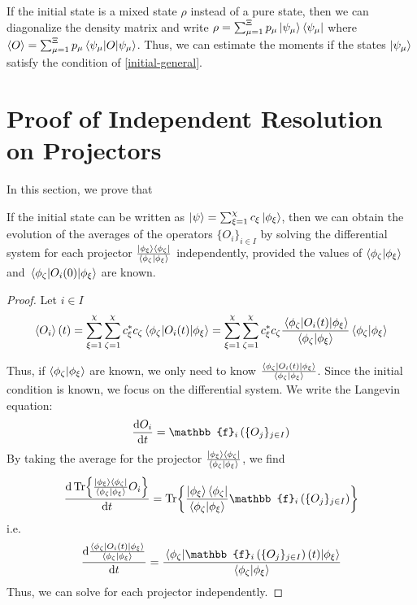 \begin{corollary}
    If the initial state is a mixed state $\rho$ instead of a pure state, then we can diagonalize the density matrix and write $\rho = \sum_{\mu=1}^\Xi p_\mu \ket{\psi_\mu}\bra{\psi_\mu}$ where $\left\langle O \right\rangle = \sum_{\mu=1}^\Xi p_\mu \mel{\psi_\mu}{O}{\psi_\mu}$. Thus, we can estimate the moments if the states $\ket{\psi_\mu}$ satisfy the condition of \autoref{initial-general}.
\end{corollary}

\section{Proof of Independent Resolution on Projectors} \label{proof-sum-gauss-non-lin}
In this section, we prove that 

\begin{theorem}
    If the initial state can be written as $\ket{\psi} = \sum_{\xi=1}^\chi c_\xi \ket{\phi_\xi}$, then we can obtain the evolution of the averages of the operators $\{O_i\}_{i \in I}$ by solving the differential system for each projector $\frac{\ket{\phi_\xi}\bra{\phi_\zeta}}{\braket{\phi_\zeta}{\phi_\xi}}$ independently, provided the values of $\braket{\phi_\zeta}{\phi_\xi}$ and $\mel{\phi_\zeta}{O_i(0)}{\phi_\xi}$ are known.
\end{theorem}

\begin{proof}
    Let $i \in I$
    \begin{eqnarray}
        \left\langle O_i \right\rangle(t) = \sum_{\xi=1}^\chi \sum_{\zeta=1}^\chi c^*_\xi c_\zeta \mel{\phi_\zeta}{O_i(t)}{\phi_\xi} = \sum_{\xi=1}^\chi \sum_{\zeta=1}^\chi c^*_\xi c_\zeta \frac{\mel{\phi_\zeta}{O_i(t)}{\phi_\xi}}{\braket{\phi_\zeta}{\phi_\xi}} \braket{\phi_\zeta}{\phi_\xi}
    \end{eqnarray}
    
    Thus, if $\braket{\phi_\zeta}{\phi_\xi}$ are known, we only need to know $\frac{\mel{\phi_\zeta}{O_i(t)}{\phi_\xi}}{\braket{\phi_\zeta}{\phi_\xi}}$. Since the initial condition is known, we focus on the differential system. We write the Langevin equation:
    \begin{equation}
        \timeDeriv{O_i} = \mathbb{f}_i\left(\{O_j\}_{j \in I}\right)
    \end{equation}
    By taking the average for the projector $\frac{\ket{\phi_\xi}\bra{\phi_\zeta}}{\braket{\phi_\zeta}{\phi_\xi}}$, we find
    \begin{equation}
        \timeDeriv{\Tr{\frac{\ket{\phi_\xi}\bra{\phi_\zeta}}{\braket{\phi_\zeta}{\phi_\xi}}  O_i}} = \Tr{\frac{\ket{\phi_\xi}\bra{\phi_\zeta}}{\braket{\phi_\zeta}{\phi_\xi}} \mathbb{f}_i\left(\{O_j\}_{j \in I}\right)}
    \end{equation}
    i.e.
    \begin{equation}
        \timeDeriv{\frac{\mel{\phi_\zeta}{O_i(t)}{\phi_\xi}}{\braket{\phi_\zeta}{\phi_\xi}}} = \frac{\mel{\phi_\zeta}{\mathbb{f}_i\left(\{O_j\}_{j \in I}\right)(t)}{\phi_\xi}}{\braket{\phi_\zeta}{\phi_\xi}}
    \end{equation}
    Thus, we can solve for each projector independently.
\end{proof}



